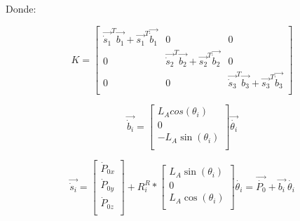         Donde: 

        \begin{equation}
                 K= \left[ \begin{matrix}
                \overrightarrow{\dot{s}_{1}}^{T}\overrightarrow{b_{1}}+\overrightarrow{s_{1}}^{T}\overrightarrow{\dot{b}_{1}}  &  0  &  0\\
                0  &  \overrightarrow{\dot{s}_{2}}^{T}\overrightarrow{b_{2}}+\overrightarrow{s_{2}}^{T}\overrightarrow{\dot{b}_{2}}  &  0\\
                0  &  0  &  \overrightarrow{\dot{s}_{3}}^{T}\overrightarrow{b_{3}}+\overrightarrow{s_{3}}^{T}\overrightarrow{\dot{b}_{3}}\\
                \end{matrix}
                 \right]  
            \label{eq:cap4_MB_17}
        \end{equation} 
        
        \begin{equation}
                  \overrightarrow{\dot{b}_{i}}= \left[ \begin{matrix}
                L_{A} cos⁡ \left(  \theta _{i} \right) \\
                0\\
                - L_{A}\sin ⁡ \left(  \theta _{i} \right) \\
                \end{matrix}
                 \right] \overrightarrow{\dot{ \theta _{i}}}  
            \label{eq:cap4_MB_18}
        \end{equation} 
        
        \begin{equation}
                  \overrightarrow{\dot{s}_{i}}= \left[ \begin{matrix}
                \dot{P}_{0x}\\
                \dot{P}_{0y}\\
                \dot{P}_{0z}\\
                \end{matrix}
                 \right] +R_{i}^{R}\ast \left[ \begin{matrix}
                L_{A}\sin  \left(  \theta _{i} \right) \\
                0\\
                L_{A}\cos  \left(  \theta _{i} \right) \\
                \end{matrix}
                 \right] \dot{ \theta _{i}}=\overrightarrow{\dot{P_{0}}}+\overrightarrow{b_{i}}~\dot{ \theta _{i}} 
            \label{eq:cap4_MB_19}
        \end{equation} 


